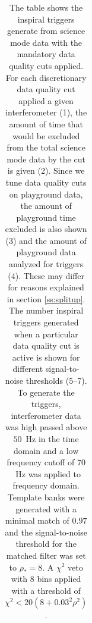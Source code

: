 \begin{table}[p]
\begin{center}
\begin{tabular}{lcccccccc}
\end{tabular}
\end{center}
\caption{\label{t:s2dqresults}%
The table shows the inspiral triggers generate from science mode data with the
mandatory data quality cuts applied. For each discretionary data quality cut
applied a given interferometer (1), the amount of time that would be excluded
from the total science mode data by the cut is given (2). Since we tune data
quality cuts on playground data, the amount of playground time excluded is
also shown (3) and the amount of playground data analyzed for triggers (4).
These may differ for reasons explained in section \ref{ss:splitup}. The number
inspiral triggers generated when a particular data quality cut is active is
shown for different signal-to-noise thresholds (5--7). To generate the
triggers, interferometer data was high passed above $50$~Hz in the time domain
and a low frequency cutoff of $70$~Hz was applied to frequency domain.
Template banks were generated with a minimal match of $0.97$ and the
signal-to-noise threshold for the matched filter was set to $\rho_\ast = 8$. A
$\chi^2$ veto with $8$ bins applied with a threshold of $\chi^2 < 20 (8 +
0.03^2 \rho^2)$. 
}
\end{table}

